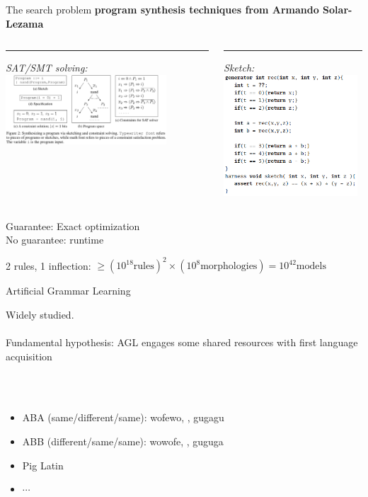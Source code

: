 \documentclass{beamer}
\newcommand{\cmark}{\ding{51}}%
\newcommand{\xmark}{\ding{55}}%
\begin{document}
\begin{frame}{The search problem}
  \textbf{program synthesis techniques from Armando Solar-Lezama}
  \begin{columns}[T] %
    \begin{column}{.6\textwidth}
      \rule{\linewidth}{4pt}
      \emph{SAT/SMT solving:}
\centering  \includegraphics[width = 6cm]{background.png}
    \end{column}%
\hfill%
\begin{column}{.5\textwidth}
  \rule{\linewidth}{4pt}
  \emph{Sketch:}
\includegraphics[width = 5cm]{generatorExample.png}
  

  
      \end{column}%
  \end{columns}
  \pause

  \Large
  \textcolor{green}{\cmark} Guarantee: Exact optimization
  \\  \textcolor{red}{\xmark} No guarantee: runtime
  \pause

  2 rules, 1 inflection: $\geq (10^{18}\text{rules})^2\times (10^{8} \text{morphologies}) = 10^{42}\text{models}$


\end{frame}



\begin{frame}{Artificial Grammar Learning}

  Widely studied. \\\\Fundamental hypothesis: AGL engages some shared resources with first language acquisition

  \\\\

  \begin{itemize}
  \item ABA (same/different/same): wofewo, , gugagu
  \item ABB (different/same/same): wowofe, , guguga
  \item Pig Latin
    \item $\cdots$
    \end{itemize}

\end{frame}
\end{document}
